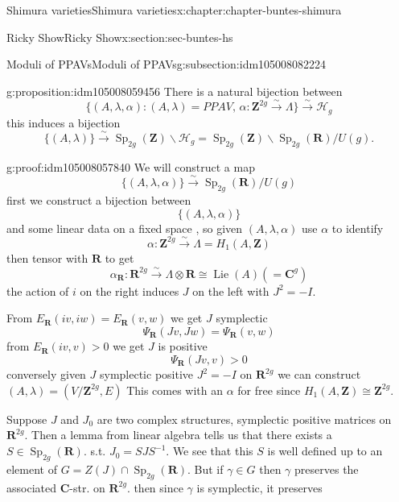\documentclass[oneside,10pt,]{book}
\numberwithin{equation}{section}
\DeclareMathOperator{\Lie}{Lie}
\newcommand{\inv}{^{-1}}
\newcommand{\ZZ}{\mathbf{Z}}
\newcommand{\RR}{\mathbf{R}}
\newcommand{\CC}{\mathbf{C}}
\DeclareMathOperator{\Sp}{Sp}
\newcommand{\gt}{>}
\begin{document}
\begin{chapterptx}{Shimura varieties}{}{Shimura varieties}{}{}{x:chapter:chapter-buntes-shimura}
\begin{sectionptx}{Ricky Show}{}{Ricky Show}{}{}{x:section:sec-buntes-hs}
\begin{subsectionptx}{Moduli of PPAVs}{}{Moduli of PPAVs}{}{}{g:subsection:idm105008082224}
\begin{proposition}{}{}{g:proposition:idm105008059456}%
There is a natural bijection between%
\begin{equation*}
\{(A,\lambda, \alpha) : (A,\lambda)= PPAV,\,\alpha\colon \ZZ^{2g} \xrightarrow \sim \Lambda\} \xrightarrow\sim \mathscr H_g
\end{equation*}
this induces a  bijection%
\begin{equation*}
\{(A,\lambda) \} \xrightarrow \sim \Sp_{2g}(\ZZ) \backslash \mathscr H_g = \Sp_{2g}(\ZZ) \backslash \Sp_{2g} (\RR) / U(g)\text{.}
\end{equation*}
%
\end{proposition}
\begin{proofptx}{}{g:proof:idm105008057840}
We will construct a map%
\begin{equation*}
\{(A,\lambda ,\alpha)\} \xrightarrow\sim\Sp_{2g} (\RR)/U(g)
\end{equation*}
first we construct  a bijection between%
\begin{equation*}
\{(A,\lambda, \alpha)\}
\end{equation*}
and some linear data on a fixed space , so given \((A, \lambda, \alpha)\) use \(\alpha\) to identify%
\begin{equation*}
\alpha\colon \ZZ^{2g} \xrightarrow \sim \Lambda = H_1(A,\ZZ)
\end{equation*}
then  tensor with \(\RR\) to get%
\begin{equation*}
\alpha_\RR \colon \RR^{2g} \xrightarrow\sim \Lambda\otimes \RR \cong \Lie(A) (= \CC^g)
\end{equation*}
the action of \(i\) on the right induces \(J\) on the left with \(J^2 = -I\).%
\par
From \(E_\RR(iv,iw) = E_\RR(v,w)\) we get \(J \) symplectic%
\begin{equation*}
\Psi_\RR(Jv, Jw) = \Psi_\RR( v,w)
\end{equation*}
from \(E_\RR(iv,v) \gt 0\) we get \(J\) is positive%
\begin{equation*}
\Psi_\RR(Jv,v) \gt 0
\end{equation*}
conversely given \(J\) symplectic positive \(J^2 = -I\) on \(\RR^{2g}\) we can construct \((A,\lambda) = (V/\ZZ^{2g}, E)\) This comes with an \(\alpha\) for free since \(H_1(A, \ZZ) \cong \ZZ^{2g}\).%
\par
Suppose \(J\) and \(J_0\) are two complex structures, symplectic positive matrices on \(\RR^{2g}\). Then a lemma from linear algebra tells us that there exists a \(S \in \Sp_{2g}(\RR)\). s.t. \(J_0  = S J S \inv\). We see that this \(S\) is well defined up to an element of \(G = Z(J) \cap \Sp_{2g}(\RR)\). But if \(\gamma \in G \) then \(\gamma\) preserves the associated \(\CC\)-str. on \(\RR^{2g}\). then since \(\gamma\) is symplectic, it preserves%

\end{proofptx}
\end{subsectionptx}
\end{sectionptx}
\end{chapterptx}
\end{document}
